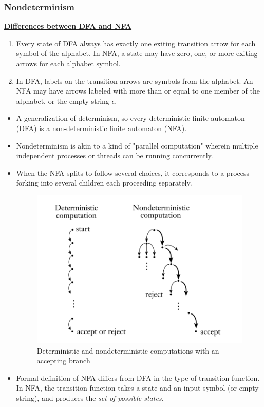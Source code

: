 \documentclass[11pt]{article}
\theoremstyle{definition}
\begin{document}
\subsubsection{Nondeterminism}
\textbf{\underline{Differences between DFA and NFA}}
    \begin{enumerate}
        \item Every state of DFA always has exactly one exiting transition arrow for each symbol of the alphabet. In NFA, a state may have zero, one, or more exiting arrows for each alphabet symbol.
        \item In DFA, labels on the transition arrows are symbols from the alphabet. An NFA may have arrows labeled with more than or equal to one member of the alphabet, or the empty string $\epsilon$.
    \end{enumerate}
\begin{itemize}[leftmargin=*]
    \item A generalization of determinism, so every deterministic finite automaton (DFA) is a non-deterministic finite automaton (NFA).
    \item Nondeterminism is akin to a kind of "parallel computation" wherein multiple independent processes or threads can be running concurrently. 
    \item When the NFA splits to follow several choices, it corresponds to a process forking into several children each proceeding separately.
    \begin{figure}[h]
    	\centering
    	\includegraphics[width=0.5\linewidth]{nfa.png}
    	\caption{Deterministic and nondeterministic computations with an accepting branch}
    	\label{fig}
    \end{figure}
    \item Formal definition of NFA differs from DFA in the type of transition function. In NFA, the transition function takes a state and an input symbol (or empty string), and produces the \textit{set of possible states.}
\end{itemize}
\end{document}
